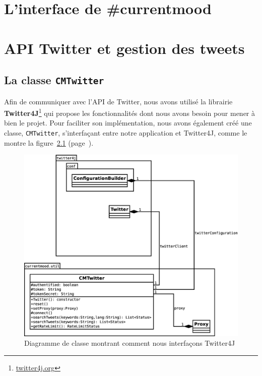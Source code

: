 \documentclass[12pt,a4paper]{report}
\newcommand{\CMName}{\#currentmood}
\begin{document}
\chapter{L'interface de \CMName}



\chapter{API Twitter et gestion des tweets}

\section{La classe \texttt{CMTwitter}}

Afin de communiquer avec l'API de Twitter, nous avons utilisé la librairie
\textbf{Twitter4J}\footnote{\href{http://twitter4j.org}{twitter4j.org}} qui
propose les fonctionnalités dont nous avons besoin pour mener à bien le projet.
Pour faciliter son implémentation, nous avons également créé une classe,
\texttt{CMTwitter}, s'interfaçant entre notre application et Twitter4J, comme le
montre la figure~\ref{uml_cmtwitter} (page~\pageref{uml_cmtwitter}).

\begin{figure}%
	\includegraphics[width=\textwidth]{img/uml_cmtwitter.eps}
	\caption{Diagramme de classe montrant comment nous interfaçons Twitter4J}
	\label{uml_cmtwitter}
\end{figure}
\end{document}
